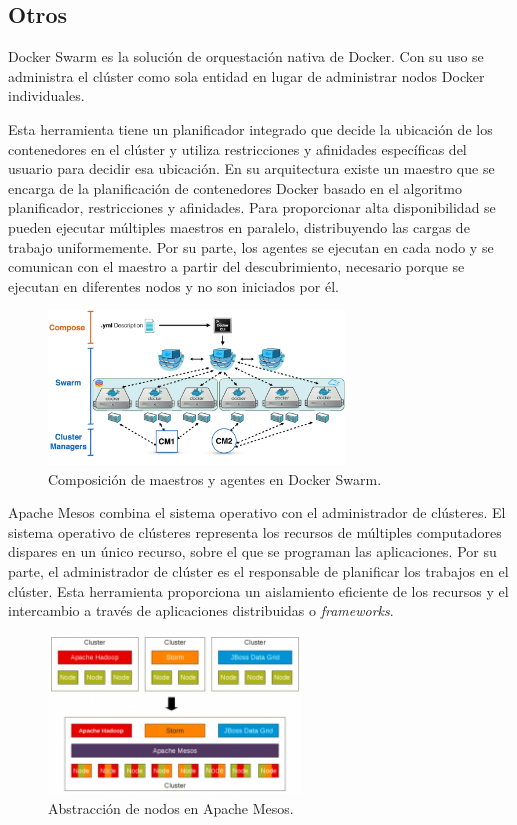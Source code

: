 \subsection{Otros}

Docker Swarm es la solución de orquestación nativa de Docker. Con su uso se administra el clúster como sola entidad en lugar de administrar nodos Docker individuales. 

Esta herramienta tiene un planificador integrado que decide la ubicación de los contenedores en el clúster y utiliza restricciones y afinidades específicas del usuario para decidir esa ubicación. En su arquitectura existe un maestro que se encarga de la planificación de contenedores Docker basado en el algoritmo planificador, restricciones y afinidades. Para proporcionar alta disponibilidad se pueden ejecutar múltiples maestros en paralelo, distribuyendo las cargas de trabajo uniformemente. Por su parte, los agentes se ejecutan en cada nodo y se comunican con el maestro a partir del descubrimiento, necesario porque se ejecutan en diferentes nodos y no son iniciados por él.

\begin{figure}[H]
\centering
\includegraphics[width=0.7\textwidth]{images/figures/dockermasterandagent.png}
\caption{Composición de maestros y agentes en Docker Swarm.\label{fig:figure_placement_example}}
\end{figure}
	
Apache Mesos combina el sistema operativo con el administrador de clústeres. El sistema operativo de clústeres representa los recursos de múltiples computadores dispares en un único recurso, sobre el que se programan las aplicaciones. Por su parte, el administrador de clúster es el responsable de planificar los trabajos en el clúster. Esta herramienta proporciona un aislamiento eficiente de los recursos y el intercambio a través de aplicaciones distribuidas o \textit{frameworks}.

\begin{figure}[H]
\centering
\includegraphics[width=0.6\textwidth]{images/figures/apachemesos.png}
\caption{Abstracción de nodos en Apache Mesos.\label{fig:figure_placement_example}}
\end{figure}


